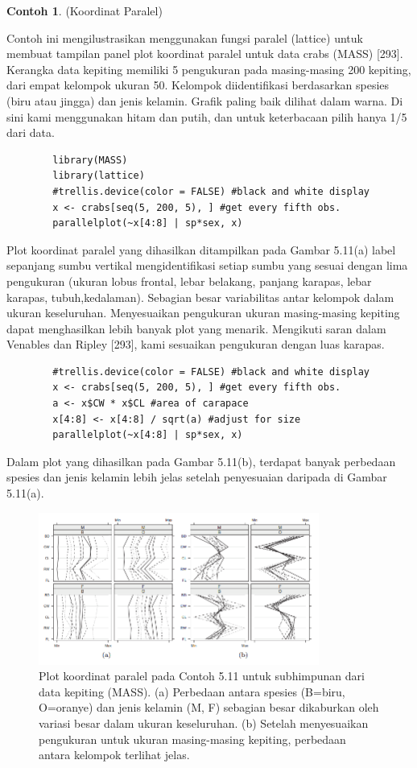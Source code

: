 \documentclass[a4paper,12pt]{article}
\theoremstyle{definition}
\newtheorem{example}{Contoh}[section]
\begin{document}
\begin{example} (Koordinat Paralel)

    Contoh ini mengilustrasikan menggunakan fungsi paralel (lattice) untuk membuat tampilan panel plot koordinat paralel untuk data crabs (MASS) [293]. Kerangka data kepiting memiliki 5 pengukuran pada masing-masing 200 kepiting, dari empat kelompok ukuran 50. Kelompok diidentifikasi berdasarkan spesies (biru atau jingga) dan jenis kelamin. Grafik paling baik dilihat dalam warna. Di sini kami menggunakan hitam dan putih, dan untuk keterbacaan pilih hanya 1/5 dari data.

    \begin{lstlisting}
        library(MASS)
        library(lattice)
        #trellis.device(color = FALSE) #black and white display
        x <- crabs[seq(5, 200, 5), ] #get every fifth obs.
        parallelplot(~x[4:8] | sp*sex, x)
    \end{lstlisting}

    Plot koordinat paralel yang dihasilkan ditampilkan pada Gambar 5.11(a) label sepanjang sumbu vertikal mengidentifikasi setiap sumbu yang sesuai dengan lima pengukuran (ukuran lobus frontal, lebar belakang, panjang karapas, lebar karapas, tubuh,kedalaman). Sebagian besar variabilitas antar kelompok dalam ukuran keseluruhan. Menyesuaikan pengukuran ukuran masing-masing kepiting dapat menghasilkan lebih banyak plot yang menarik. Mengikuti saran dalam Venables dan Ripley [293], kami sesuaikan pengukuran dengan luas karapas.

    \begin{lstlisting}
        #trellis.device(color = FALSE) #black and white display
        x <- crabs[seq(5, 200, 5), ] #get every fifth obs.
        a <- x$CW * x$CL #area of carapace
        x[4:8] <- x[4:8] / sqrt(a) #adjust for size
        parallelplot(~x[4:8] | sp*sex, x)
    \end{lstlisting}

    Dalam plot yang dihasilkan pada Gambar 5.11(b), terdapat banyak perbedaan spesies dan jenis kelamin lebih jelas setelah penyesuaian daripada di Gambar 5.11(a).

    \begin{figure} [H]
        \centering
        \includegraphics[height=5cm]{gb/K3G3.png}
        \caption{Plot koordinat paralel pada Contoh 5.11 untuk subhimpunan dari data kepiting (MASS). (a) Perbedaan antara spesies (B=biru, O=oranye) dan jenis kelamin (M, F) sebagian besar dikaburkan oleh variasi besar dalam ukuran keseluruhan. (b) Setelah menyesuaikan pengukuran untuk ukuran masing-masing kepiting, perbedaan antara kelompok terlihat jelas.}
        \label{fig:my_label}
    \end{figure}
\end{example}
\end{document}
